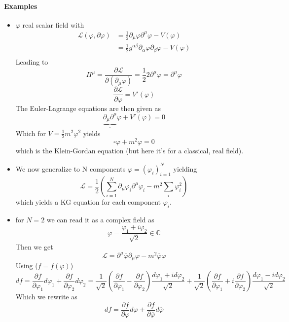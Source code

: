 \documentclass{report}
\begin{document}
\paragraph{Examples}
\begin{itemize}
  \item $\varphi$ real scalar field with 
\begin{align*}
  \mathcal{L} \left( \varphi, \partial \varphi  \right) &= \frac{1}{2} \partial_\mu \varphi \partial^{\mu} \varphi - V\left( \varphi \right)   \\
  &= \frac{1}{2}  g^{\alpha \beta} \partial_\alpha \varphi \partial_\beta \varphi - V\left( \varphi \right)    \\
\end{align*}
  Leading to \[
    \Pi^{\mu} = \frac{\partial \mathcal{L} }{\partial ( \partial_\mu \varphi  )} = \frac{1}{2}  2 \partial^{\mu} \varphi = \partial^{\mu} \varphi  
  \] \[
  \frac{\partial \mathcal{L} }{\partial \varphi} = V'\left( \varphi \right) 
  \] The Euler-Lagrange equations are then given as \[
  \underbrace{\partial_\mu \partial^{\mu}   }_{\square  } \varphi  + V'\left( \varphi \right) = 0
  \] Which for $V = \frac{1}{2} m^2 \varphi^2$ yields \[
  \square \varphi + m^2 \varphi = 0
  \] which is the Klein-Gordan equation (but here it's for a classical, real field).
  \item We now generalize to N components $\varphi = \left( \varphi_i \right)_{i=1}^{N} $ yielding \[
  \mathcal{L} = \frac{1}{2} \left( \sum_{i=1}^{N} \partial_\mu \varphi_i \partial^{\mu} \varphi_i - m^2 \sum_{i}^{} \varphi_i^2 \right) 
  \] which yields a KG equation for each component $\varphi_i$. 
  \item for $N = 2$ we can read it as a complex field as \[
  \varphi = \frac{\varphi_1 + i \varphi_2}{\sqrt{2} } \in \mathbb{C}
  \] Then we get \[
  \mathcal{L} = \partial^{\mu} \overline{\varphi} \partial_\mu \varphi - m^2 \overline{\varphi} \varphi  
\] Using ($f=f\left( \varphi \right) $) \[
df = \frac{\partial f}{\partial \varphi_1} d\varphi_1 + \frac{\partial f}{\partial \varphi_2} d\varphi_2 
= \frac{1}{\sqrt{2} } \left( \frac{\partial f}{\partial \varphi_1}  - \frac{\partial f}{\partial \varphi_2}   \right) \frac{d\varphi_1 + i d\varphi_2}{\sqrt{2} } + \frac{1}{\sqrt{2} } \left( \frac{\partial f}{\partial \varphi_1} + i \frac{\partial f}{\partial \varphi_2}   \right) \frac{d\varphi_1 - i d\varphi_2}{\sqrt{2} } 
\] Which we rewrite as \[
df = \frac{\partial f}{\partial \varphi} d\varphi + \frac{\partial f}{\partial \overline{\varphi} } d \overline{\varphi} 
\]
\end{itemize}
\end{document}
